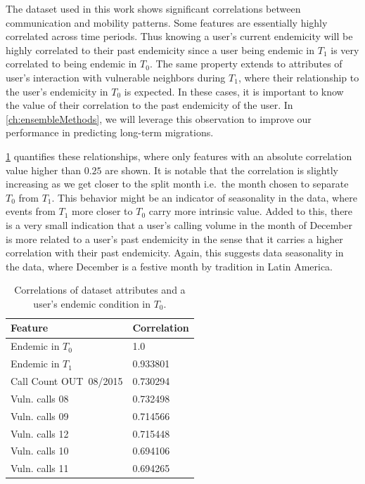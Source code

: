 The dataset used in this work shows significant correlations between communication and mobility patterns.
Some features are essentially highly correlated across time periods.
Thus knowing a user's current endemicity will be highly correlated to their past endemicity since a user being endemic in $T_1$ is very correlated to being endemic in $T_0$.
The same property extends to attributes of user's interaction with vulnerable neighbors during $T_1$, where their relationship to the user's endemicity in $T_0$ is expected.
In these cases, it is important to know the value of their correlation to the past endemicity of the user.
In \cref{ch:ensembleMethods}, we will leverage this observation to improve our performance in predicting long-term migrations.

\cref{tab:featureCorrelations} quantifies these relationships, where only features with an absolute correlation value higher than $0.25$ are shown.
It is notable that the correlation is slightly increasing as we get closer to the split month i.e.\ the month chosen to separate $T_0$ from $T_1$.
This behavior might be an indicator of seasonality in the data, where events from $T_1$ more closer to $T_0$ carry more intrinsic value.
Added to this, there is a very small indication that a user's calling volume in the month of December is more related to a user's past endemicity in the sense that it carries a higher correlation with their past endemicity.
Again, this suggests data seasonality in the data, where December is a festive month by tradition in Latin America.


\begin{table}
	\caption{Correlations of dataset attributes and a user's endemic condition in $T_0$.}
	\label{tab:featureCorrelations}
	\centering
	\begin{tabular}{l l }
		\toprule
		Feature & Correlation \\
		\midrule
		Endemic in $T_0$        & 1.0 \\
		Endemic in $T_1$        & 0.933801 \\
		Call Count  OUT\ 08/2015  & 0.730294 \\
		Vuln. calls  08 &0.732498 \\
		Vuln. calls  09   &0.714566 \\
		Vuln. calls 12  &0.715448 \\
		Vuln. calls  10  &0.694106 \\
		Vuln. calls  11   &0.694265 \\
		\bottomrule
	\end{tabular}
\end{table}



